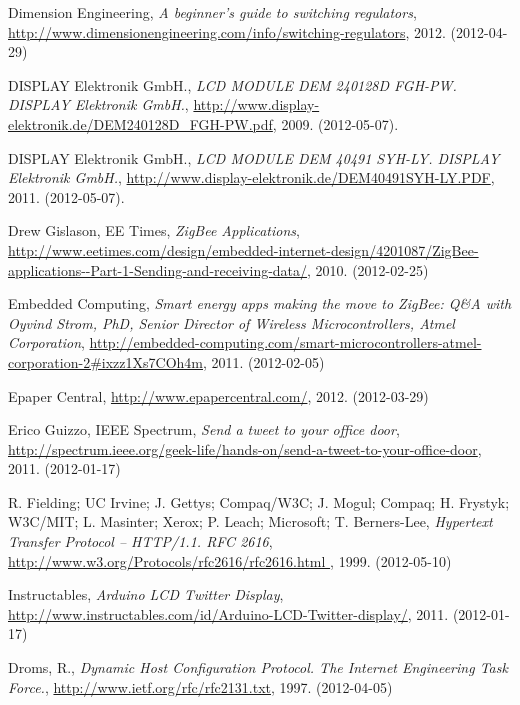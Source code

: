 \documentclass[a4paper,11pt]{article}
\begin{document}
\begin{thebibliography}{9}
\label{dimension}
    Dimension Engineering,
    \emph{A beginner’s guide to switching regulators},
    \url{http://www.dimensionengineering.com/info/switching-regulators},
    2012. (2012-04-29)

\label{lcdalfa}
    DISPLAY Elektronik GmbH.,
    \emph{LCD MODULE DEM 240128D FGH-PW. DISPLAY Elektronik GmbH.},
    \url{http://www.display-elektronik.de/DEM240128D_FGH-PW.pdf},
    2009. (2012-05-07).

\label{lcdgraph}
    DISPLAY Elektronik GmbH.,
    \emph{LCD MODULE DEM 40491 SYH-LY. DISPLAY Elektronik GmbH.},
    \url{http://www.display-elektronik.de/DEM40491SYH-LY.PDF},
    2011. (2012-05-07).

\label{eetimes}
    Drew Gislason, 
    EE Times,
    \emph{ZigBee Applications},
    \url{ http://www.eetimes.com/design/embedded-internet-design/4201087/ZigBee-applications--Part-1-Sending-and-receiving-data/},
    2010. (2012-02-25)

\label{embedded}
    Embedded Computing,
    \emph{Smart energy apps making the move to ZigBee: Q\&A with Oyvind Strom, PhD, Senior Director of Wireless Microcontrollers, Atmel Corporation},
    \url{http://embedded-computing.com/smart-microcontrollers-atmel-corporation-2#ixzz1Xs7COh4m},
    2011. (2012-02-05)

\label{epapercentral}
    Epaper Central,
    \url{http://www.epapercentral.com/},
    2012. (2012-03-29)

\label{spectrum}
    Erico Guizzo, 
    IEEE Spectrum,
    \emph{Send a tweet to your office door},
    \url{http://spectrum.ieee.org/geek-life/hands-on/send-a-tweet-to-your-office-door},
    2011. (2012-01-17)

\label{fielding}
\label{rfc2616}
R. Fielding; UC Irvine; J. Gettys; Compaq/W3C; J. Mogul; Compaq; H. Frystyk; W3C/MIT; L. Masinter; Xerox; P. Leach; Microsoft; T. Berners-Lee,
\emph{Hypertext Transfer Protocol -- HTTP/1.1. RFC 2616},
\url{http://www.w3.org/Protocols/rfc2616/rfc2616.html },
1999. (2012-05-10)

\label{instructables}
    Instructables,
    \emph{Arduino LCD Twitter Display},
    \url{http://www.instructables.com/id/Arduino-LCD-Twitter-display/},
    2011. (2012-01-17)

\label{droms}
    Droms, R.,
    \emph{Dynamic Host Configuration Protocol. The Internet Engineering Task Force.},
    \url{http://www.ietf.org/rfc/rfc2131.txt},
    1997. (2012-04-05)


\end{thebibliography}
\end{document}
